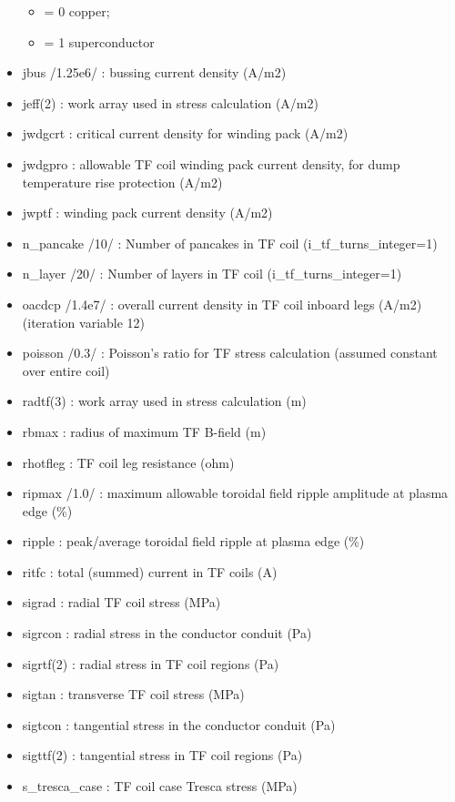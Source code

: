 \documentclass[]{article}
\providecommand{\tightlist}{%
  \setlength{\itemsep}{0pt}\setlength{\parskip}{0pt}}
\begin{document}
\begin{itemize}
  \begin{itemize}
  \tightlist
  \item
    = 0 copper;
  \item
    = 1 superconductor
  \end{itemize}
\item
  jbus /1.25e6/ : bussing current density (A/m2)
\item
  jeff(2) : work array used in stress calculation (A/m2)
\item
  jwdgcrt : critical current density for winding pack (A/m2)
\item
  jwdgpro : allowable TF coil winding pack current density, for dump
  temperature rise protection (A/m2)
\item
  jwptf : winding pack current density (A/m2)
\item
  n\_pancake /10/ : Number of pancakes in TF coil
  (i\_tf\_turns\_integer=1)
\item
  n\_layer /20/ : Number of layers in TF coil (i\_tf\_turns\_integer=1)
\item
  oacdcp /1.4e7/ : overall current density in TF coil inboard legs
  (A/m2) (iteration variable 12)
\item
  poisson /0.3/ : Poisson's ratio for TF stress calculation (assumed
  constant over entire coil)
\item
  radtf(3) : work array used in stress calculation (m)
\item
  rbmax : radius of maximum TF B-field (m)
\item
  rhotfleg : TF coil leg resistance (ohm)
\item
  ripmax /1.0/ : maximum allowable toroidal field ripple amplitude at
  plasma edge (\%)
\item
  ripple : peak/average toroidal field ripple at plasma edge (\%)
\item
  ritfc : total (summed) current in TF coils (A)
\item
  sigrad : radial TF coil stress (MPa)
\item
  sigrcon : radial stress in the conductor conduit (Pa)
\item
  sigrtf(2) : radial stress in TF coil regions (Pa)
\item
  sigtan : transverse TF coil stress (MPa)
\item
  sigtcon : tangential stress in the conductor conduit (Pa)
\item
  sigttf(2) : tangential stress in TF coil regions (Pa)
\item
  s\_tresca\_case : TF coil case Tresca stress (MPa)

\end{itemize}
\end{document}
